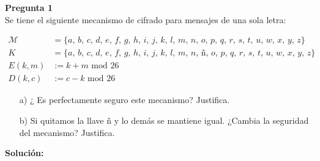 \documentclass{article}
\newenvironment{problem}[2][Pregunta]
    { \begin{mdframed}[backgroundcolor=gray!20] \textbf{#1 #2} \\}
    {  \end{mdframed}}
\begin{document}

\begin{problem}
  {1} Se tiene el siguiente mecanismo de cifrado para mensajes de una sola letra:

  \begin{align*}
    \mathcal{M} &= \{a,\,b,\,c,\,d,\,e,\,f,\,g,\,h,\,i,\,j,\,k,\,l,\,m,\,n,\,o,\,p,\,q,\,r,\,s,\,t,\,u,\,w,\,x,\,y,\,z\} \\
    K &= \{a,\,b,\,c,\,d,\,e,\,f,\,g,\,h,\,i,\,j,\,k,\,l,\,m,\,n,\,ñ,\,o,\,p,\,q,\,r,\,s,\,t,\,u,\,w,\,x,\,y,\,z\}\\
    E(k, m) &:= k+m\text{ mod } 26\\
    D(k, c) &:= c-k \text{ mod } 26
  \end{align*}


  \begin{enumerate}
  \item[a)] ¿ Es perfectamente seguro este mecanismo? Justifica.
  \item[b)] Si quitamos la llave ñ y lo demás se mantiene igual. ¿Cambia la seguridad
    del mecanismo? Justifica.
  \end{enumerate}
\end{problem}

{\bf Solución:}
\end{document}
